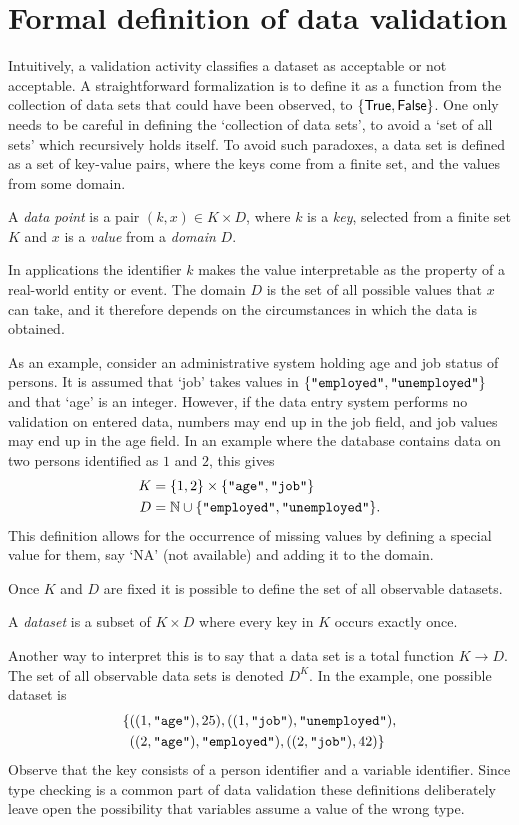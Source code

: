 \section{Formal definition of data validation}
Intuitively, a validation activity classifies a dataset as acceptable or not
acceptable.  A straightforward formalization is to define it as a function from
the collection of data sets that could have been observed, to
$\{\textsf{True}{},\textsf{False}{}\}$. One only needs to be careful in defining the `collection
of data sets', to avoid a `set of all sets' which recursively holds itself. To
avoid such paradoxes, a data set is defined as a set of key-value pairs, where
the keys come from a finite set, and the values from some domain.
%
\begin{definition}
\label{def:point}
A \emph{data point} is a pair $(k, x)\in K\times D$, where $k$ is a \emph{key},
selected from a finite set $K$ and $x$ is a \emph{value} from a \emph{domain}
$D$.
\end{definition}
In applications the identifier $k$ makes the value interpretable as the
property of a real-world entity or event. The domain $D$ is the set of all
possible values that $x$ can take, and it therefore depends on the
circumstances in which the data is obtained. 

As an example, consider an administrative system holding age and job status of
persons. It is assumed that `job' takes values in $\{\texttt{"employed"},
\texttt{"unemployed"}\}$ and that `age' is an integer.  However, if the data entry
system performs no validation on entered data, numbers may end up in the job
field, and job values may end up in the age field.  In an example where the
database contains data on two persons identified as $1$ and $2$, this gives
\begin{align}
\begin{split}
K &= \{1,2\}\times\{\texttt{"age"}, \texttt{"job"}\}\\
D &= \mathbb{N}\cup \{\texttt{"employed"},\texttt{"unemployed"}\}.
\end{split}
\label{eq:example}
\end{align}
This definition allows for the occurrence of missing values by defining a
special value for them, say `\textsf{NA}' (not available) and adding it to the
domain.

Once $K$ and $D$ are fixed it is possible to define the set of all
observable datasets.
\begin{definition}
A \emph{dataset} is a subset of $K\times D$ where every key in $K$
occurs exactly once.
\end{definition}
Another way to interpret this is to say that a data set is a total function
$K\to D$. The set of all observable data sets is denoted $D^K$. In the example,
one possible dataset is
\begin{align*}
  & \{((1,\str{age}), 25), ((1,\str{job}), \str{unemployed}),\\
  &\phantom{\{} ((2,\str{age}), \str{employed}), ((2,\str{job}), 42)\}
\end{align*}
Observe that the key consists of a person identifier and a variable identifier.
Since type checking is a common part of data validation these definitions
deliberately leave open the possibility that variables assume a value of the
wrong type. 

